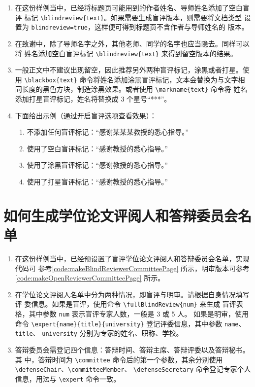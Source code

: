 \documentclass[lang=chs, degree=phd, blindreview=false, winfonts=true]{yanputhesis}
\begin{document}
\begin{enumerate}
    \setlength{\itemsep}{0pt}
    \item 在这份样例当中，已经将标题页可能用到的作者姓名、导师姓名添加了空白盲评
          标记 \lstinline`\blindreview{text}`。如果需要生成盲评版本，则需要将文档类型
          设置为 \lstinline`blindreview=true`，这样便可得到标题页不含作者与导师姓名的
          版本。
    \item 在致谢中，除了导师名字之外，其他老师、同学的名字也应当隐去。同样可以将
          姓名添加空白盲评标记 \lstinline`\blindreview{text}` 来得到留空版本的结果。
    \item 一般正文中不建议出现留空，因此推荐另外两种盲评标记，涂黑或者打星。使用
          \lstinline`\blackbox{text}` 命令将姓名添加涂黑盲评标记，文本会替换为与文字相
          同长度的黑色方块，制造涂黑效果。或者使用 \lstinline`\markname{text}` 命令将
          姓名添加打星盲评标记，姓名将替换成 3 个星号“***”。
    \item 下面给出示例（通过开启盲评选项查看效果）：
          \begin{enumerate}
              \setlength{\itemsep}{0pt}
              \item 不添加任何盲评标记：“感谢某某某教授的悉心指导。”
              \item 使用了空白盲评标记：“感谢教授的悉心指导。”
              \item 使用了涂黑盲评标记：“感谢教授的悉心指导。”
              \item 使用了打星盲评标记：“感谢教授的悉心指导。”
          \end{enumerate}
\end{enumerate}

\section{如何生成学位论文评阅人和答辩委员会名单}

\begin{enumerate}
    \setlength{\itemsep}{0pt}
    \item 在这份样例当中，已经预设置了盲评学位论文评阅人和答辩委员会名单，实现代码可
          参考\autoref{code:makeBlindReviewerCommitteePage} 所示，明审版本可参考
          \autoref{code:makeOpenReviewerCommitteePage} 所示。
    \item 在学位论文评阅人名单中分为两种情况，即盲评与明审。请根据自身情况填写评
          委信息。如果是盲评，使用命令 \lstinline`\fullBlindReview{num}` 来生成
          盲评表格，其中参数 \lstinline`num` 表示盲评专家人数，一般是 3 或 5 人。
          如果是明审，使用命令 \lstinline`\expert{name}{title}{university}`
          登记评委信息，其中参数 \lstinline`name`、\lstinline`title`、
          \lstinline`university` 分别为专家的姓名、职称、学校。
    \item 答辩委员会需登记四个信息：答辩时间、答辩主席、答辩评委以及答辩秘书。其
          中，答辩时间为 \lstinline`\committee` 命令后的第一个参数，其余分别使用
          \lstinline`\defenseChair`、\lstinline`\committeeMember`、
          \lstinline`\defenseSecretary` 命令登记专家个人信息，用法与
          \lstinline`\expert` 命令一致。
\end{enumerate}
\end{document}
